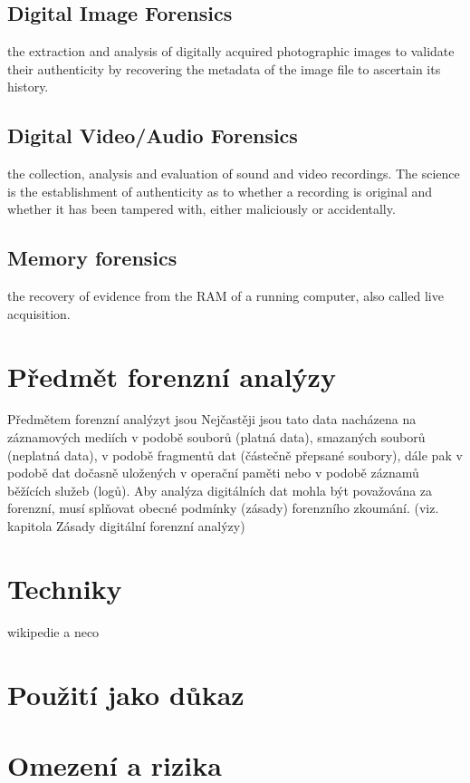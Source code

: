 \documentclass[thesis=B,czech]{FITthesis}[2012/06/26]
\begin{document}
\subsection{Digital Image Forensics }
the extraction and analysis of digitally acquired photographic images to validate their authenticity by recovering the metadata of the image file to ascertain its history.
\subsection{Digital Video/Audio Forensics}
the collection, analysis and evaluation of sound and video recordings. The science is the establishment of authenticity as to whether a recording is original and whether it has been tampered with, either maliciously or accidentally.
\subsection{Memory forensics}
the recovery of evidence from the RAM of a running computer, also called live acquisition.

\section{Předmět forenzní analýzy}

Předmětem forenzní analýzyt jsou
Nejčastěji jsou tato data nacházena na záznamových mediích v podobě
souborů (platná data), smazaných souborů (neplatná data), v podobě fragmentů
dat (částečně přepsané soubory), dále pak v podobě dat dočasně uložených
v operační paměti nebo v podobě záznamů běžících služeb (logů).
Aby analýza digitálních dat mohla být považována za forenzní, musí splňovat
obecné podmínky (zásady) forenzního zkoumání. (viz. kapitola Zásady digitální
forenzní analýzy)

\section{Techniky}

wikipedie a neco

\section{Použití jako důkaz}

\section{Omezení a rizika}
\end{document}
